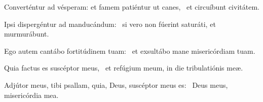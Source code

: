 \item Converténtur ad vésperam: et famem patiéntur ut canes,~\psstar{} et circuíbunt civitátem.

\item Ipsi dispergéntur ad manducándum:~\psstar{} si vero non fúerint saturáti, et murmurábunt.

\item Ego autem cantábo fortitúdinem tuam:~\psstar{} et exsultábo mane misericórdiam tuam.

\item Quia factus es suscéptor meus,~\psstar{} et refúgium meum, in die tribulatiónis meæ.

\item Adjútor meus, tibi psallam, quia, Deus, suscéptor meus es:~\psstar{} Deus meus, misericórdia mea.